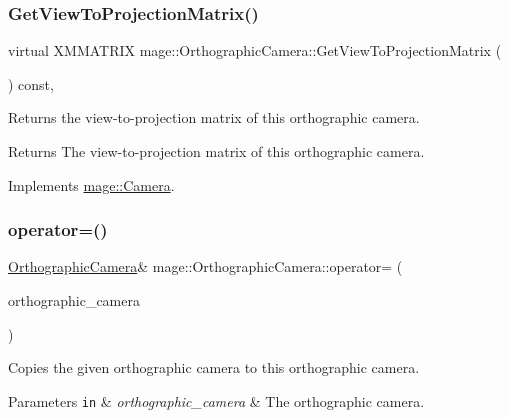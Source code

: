 \subsubsection{\texorpdfstring{Get\+View\+To\+Projection\+Matrix()}{GetViewToProjectionMatrix()}}
{\footnotesize\ttfamily virtual X\+M\+M\+A\+T\+R\+IX mage\+::\+Orthographic\+Camera\+::\+Get\+View\+To\+Projection\+Matrix (\begin{DoxyParamCaption}{ }\end{DoxyParamCaption}) const\hspace{0.3cm}{\ttfamily [override]}, {\ttfamily [virtual]}}

Returns the view-\/to-\/projection matrix of this orthographic camera.

\begin{DoxyReturn}{Returns}
The view-\/to-\/projection matrix of this orthographic camera. 
\end{DoxyReturn}


Implements \hyperlink{classmage_1_1_camera_a1f5206864cf18b5548219492556df5d2}{mage\+::\+Camera}.

\hypertarget{classmage_1_1_orthographic_camera_a2708bae64577677d4d5d1722a9ce0e9f}{}\label{classmage_1_1_orthographic_camera_a2708bae64577677d4d5d1722a9ce0e9f} 
\subsubsection{\texorpdfstring{operator=()}{operator=()}\hspace{0.1cm}{\footnotesize\ttfamily [1/2]}}
{\footnotesize\ttfamily \hyperlink{classmage_1_1_orthographic_camera}{Orthographic\+Camera}\& mage\+::\+Orthographic\+Camera\+::operator= (\begin{DoxyParamCaption}\item[{const \hyperlink{classmage_1_1_orthographic_camera}{Orthographic\+Camera} \&}]{orthographic\+\_\+camera }\end{DoxyParamCaption})\hspace{0.3cm}{\ttfamily [default]}}

Copies the given orthographic camera to this orthographic camera.


\begin{DoxyParams}[1]{Parameters}
\mbox{\tt in}  & {\em orthographic\+\_\+camera} & The orthographic camera. \\
\hline
\end{DoxyParams}
\hypertarget{classmage_1_1_orthographic_camera_aaf29c1fcc52d0a5e6cfdb65b9c840174}{}\label{classmage_1_1_orthographic_camera_aaf29c1fcc52d0a5e6cfdb65b9c840174} 
